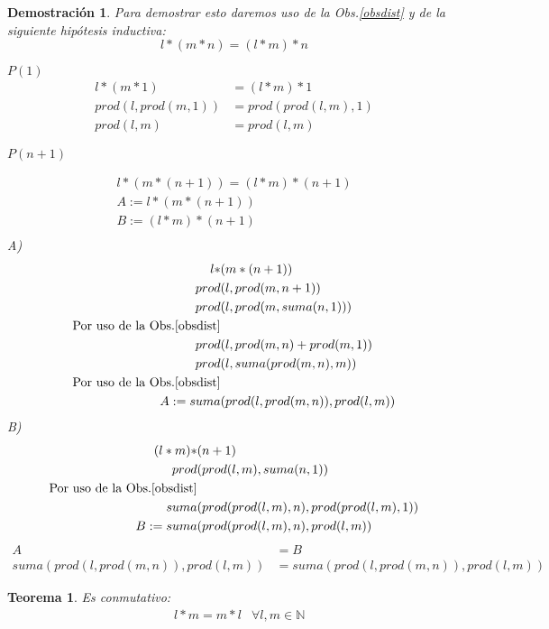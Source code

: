\documentclass[9pt,a4paper]{article}
\theoremstyle{definition}
\theoremstyle{plain}
\newtheorem{teo}{Teorema}
\newtheorem{demo}{Demostración}[teo]
\begin{document}
\begin{demo}
Para demostrar esto daremos uso de la Obs.\ref{obsdist} y de la siguiente hipótesis inductiva:\\

$$l*(m*n)=(l*m)*n$$

$P(1)$
\begin{align*}
l*(m*1) &= (l*m)*1\\
prod(l,prod(m,1)) &= prod(prod(l,m), 1)\\
prod(l,m) &= prod(l,m)
\end{align*}

$P(n+1)$

\begin{align*}
l*(m*(n+1)) = (l*m)*(n+1)\\
A := l*(m*(n+1))\\
B := (l*m)*(n+1)\\
\end{align*}
A)
\begin{align*}
l*&(m*(n+1))\\
prod&(l,prod(m,n+1))\\
prod&(l,prod(m,suma(n,1)))\\
\text{Por uso de la Obs.\ref{obsdist}}\\
prod&(l, prod(m,n)+prod(m,1))\\
prod&(l, suma(prod(m,n),m))\\
\text{Por uso de la Obs.\ref{obsdist}}\\
A := suma&(prod(l, prod(m,n)),prod(l,m))
\end{align*}
B)
\begin{align*}
(l*m)*&(n+1)\\
prod&(prod(l,m),suma(n,1))\\
\text{Por uso de la Obs.\ref{obsdist}}\\
suma&(prod(prod(l,m),n),prod(prod(l,m),1))\\
B := suma&(prod(prod(l,m),n),prod(l,m))\\
\end{align*}
\begin{align*}
A &= B\\
suma(prod(l, prod(m,n)),prod(l,m)) &= suma(prod(l, prod(m,n)),prod(l,m))
\end{align*}
\end{demo}

\begin{teo} \label{teomonpro}Es conmutativo:\\
\begin{align*} & l*m=m*l & \forall l,m\in{\mathbb{N}} \end{align*}
\end{teo}
\end{document}
